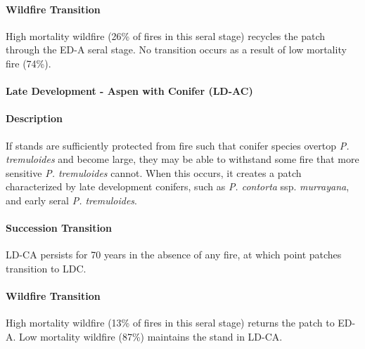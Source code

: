 \paragraph{Wildfire Transition} High mortality wildfire (26\% of fires in this seral stage) recycles the patch through the ED-A seral stage. No transition occurs as a result of low mortality fire (74\%).

\noindent\hrulefill


\paragraph{Late Development - Aspen with Conifer (LD-AC)}

\paragraph{Description} If stands are sufficiently protected from fire such that conifer species overtop \emph{P. tremuloides} and become large, they may be able to withstand some fire that more sensitive \emph{P. tremuloides} cannot. When this occurs, it creates a patch characterized by late development conifers, such as \emph{P. contorta} ssp. \emph{murrayana}, and early seral \emph{P. tremuloides}. 

\paragraph{Succession Transition} LD-CA persists for 70 years in the absence of any fire, at which point patches transition to LDC. 

\paragraph{Wildfire Transition} High mortality wildfire (13\% of fires in this seral stage) returns the patch to ED-A. Low mortality wildfire (87\%) maintains the stand in LD-CA. 

\noindent\hrulefill




